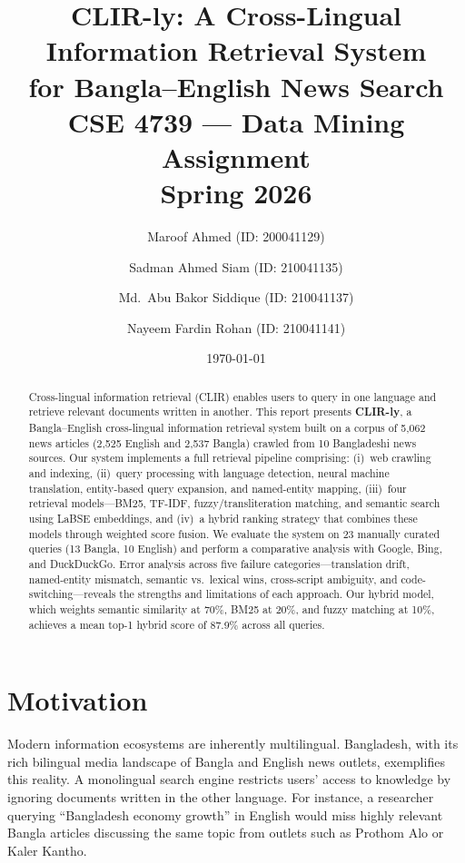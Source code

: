 \documentclass[12pt,a4paper]{article}
\title{
    \vspace{-1cm}
    \textbf{CLIR-ly: A Cross-Lingual Information Retrieval System\\for Bangla--English News Search}\\[0.5cm]
    \large CSE 4739 --- Data Mining Assignment\\[0.3cm]
    \normalsize Spring 2026
}
\author{
    Maroof Ahmed (ID: 200041129) \and
    Sadman Ahmed Siam (ID: 210041135) \and
    Md.\ Abu Bakor Siddique (ID: 210041137) \and
    Nayeem Fardin Rohan (ID: 210041141)
}
\date{\today}
\begin{document}
\maketitle
\thispagestyle{empty}

\begin{abstract}
Cross-lingual information retrieval (CLIR) enables users to query in one language and retrieve relevant documents written in another. This report presents \textbf{CLIR-ly}, a Bangla--English cross-lingual information retrieval system built on a corpus of 5{,}062 news articles (2{,}525 English and 2{,}537 Bangla) crawled from 10 Bangladeshi news sources. Our system implements a full retrieval pipeline comprising: (i)~web crawling and indexing, (ii)~query processing with language detection, neural machine translation, entity-based query expansion, and named-entity mapping, (iii)~four retrieval models---BM25, TF-IDF, fuzzy/transliteration matching, and semantic search using LaBSE embeddings, and (iv)~a hybrid ranking strategy that combines these models through weighted score fusion. We evaluate the system on 23 manually curated queries (13 Bangla, 10 English) and perform a comparative analysis with Google, Bing, and DuckDuckGo. Error analysis across five failure categories---translation drift, named-entity mismatch, semantic vs.\ lexical wins, cross-script ambiguity, and code-switching---reveals the strengths and limitations of each approach. Our hybrid model, which weights semantic similarity at 70\%, BM25 at 20\%, and fuzzy matching at 10\%, achieves a mean top-1 hybrid score of 87.9\% across all queries.
\end{abstract}

\newpage
\tableofcontents
\newpage

\section{Motivation}

Modern information ecosystems are inherently multilingual. Bangladesh, with its rich bilingual media landscape of Bangla and English news outlets, exemplifies this reality. A monolingual search engine restricts users' access to knowledge by ignoring documents written in the other language. For instance, a researcher querying ``Bangladesh economy growth'' in English would miss highly relevant Bangla articles discussing the same topic from outlets such as Prothom Alo or Kaler Kantho.
\end{document}
